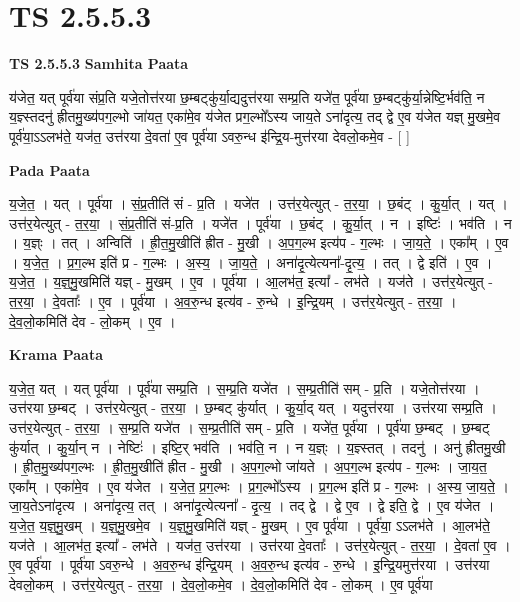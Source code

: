 \documentclass[17pt]{extarticle}
\begin{document}
\section{ TS 2.5.5.3 }

\textbf{TS 2.5.5.3 } \newline
\textbf{Samhita Paata} \newline

य॑जेत॒ यत् पूर्व॑या संप्र॒ति यजे॒तोत्त॑रया छ॒म्बट्कु॑र्या॒द्यदुत्त॑रया सम्प्र॒ति यजे॑त॒ पूर्व॑या छ॒म्बट्कु॑र्या॒न्नेष्टि॒र्भव॑ति॒ न य॒ज्ञ्स्तदनु॑ ह्रीतमु॒ख्य॑पग॒ल्भो जा॑यत॒ एका॑मे॒व य॑जेत प्रग॒ल्भो᳚ऽस्य जाय॒ते ऽना॑दृत्य॒ तद् द्वे ए॒व य॑जेत यज्ञ् मु॒खमे॒व पूर्व॑या॒ऽऽलभ॑ते॒ यज॑त॒ उत्त॑रया दे॒वता॑ ए॒व पूर्व॑या ऽवरु॒न्ध इ॑न्द्रि॒य-मुत्त॑रया देवलो॒कमे॒व - [  ] \newline

\textbf{Pada Paata} \newline

य॒जे॒त॒ । यत् । पूर्व॑या । सं॒प्र॒तीति॑ सं - प्र॒ति । यजे॑त । उत्त॑र॒येत्युत् - त॒र॒या॒ । छ॒बंट् । कु॒र्या॒त् । यत् । उत्त॑र॒येत्युत् - त॒र॒या॒ । सं॒प्र॒तीति॑ सं-प्र॒ति । यजे॑त । पूर्व॑या । छ॒बंट् । कु॒र्या॒त् । न । इष्टिः॑ । भव॑ति । न । य॒ज्ञ्ः । तत् । अन्विति॑ । ह्री॒त॒मु॒खीति॑ ह्रीत - मु॒खी । अ॒प॒ग॒ल्भ इत्य॑प - ग॒ल्भः । जा॒य॒ते॒ । एका᳚म् । ए॒व । य॒जे॒त॒ । प्र॒ग॒ल्भ इति॑ प्र - ग॒ल्भः । अ॒स्य॒ । जा॒य॒ते॒ । अना॑दृ॒त्येत्यना᳚-दृ॒त्य॒ । तत् । द्वे इति॑ । ए॒व । य॒जे॒त॒ । य॒ज्ञ्॒मु॒खमिति॑ यज्ञ् - मु॒खम् । ए॒व । पूर्व॑या । आ॒लभ॑त॒ इत्या᳚ - लभ॑ते । यज॑ते । उत्त॑र॒येत्युत् - त॒र॒या॒ । दे॒वताः᳚ । ए॒व । पूर्व॑या । अ॒व॒रु॒न्ध इत्य॑व - रु॒न्धे । इ॒न्द्रि॒यम् । उत्त॑र॒येत्युत् - त॒र॒या॒ । दे॒व॒लो॒कमिति॑ देव - लो॒कम् । ए॒व ।  \newline


\textbf{Krama Paata} \newline

य॒जे॒त॒ यत् । यत् पूर्व॑या । पूर्व॑या सम्प्र॒ति । स॒म्प्र॒ति यजे॑त । स॒म्प्र॒तीति॑ सम् - प्र॒ति । यजे॒तोत्त॑रया । उत्त॑रया छ॒म्बट् । उत्त॑र॒येत्युत् - त॒र॒या॒ । छ॒म्बट् कु॑र्यात् । कु॒र्या॒द् यत् । यदुत्त॑रया । उत्त॑रया सम्प्र॒ति । उत्त॑र॒येत्युत् - त॒र॒या॒ । स॒म्प्र॒ति यजे॑त । स॒म्प्र॒तीति॑ सम् - प्र॒ति । यजे॑त॒ पूर्व॑या । पूर्व॑या छ॒म्बट् । छ॒म्बट् कु॑र्यात् । कु॒र्या॒न् न । नेष्टिः॑ । इष्टि॒र् भव॑ति । भव॑ति॒ न । न य॒ज्ञ्ः । य॒ज्ञ्स्तत् । तदनु॑ । अनु॑ ह्रीतमु॒खी । ह्री॒त॒मु॒ख्य॑पग॒ल्भः । ह्री॒त॒मु॒खीति॑ ह्रीत - मु॒खी । अ॒प॒ग॒ल्भो जा॑यते । अ॒प॒ग॒ल्भ इत्य॑प - ग॒ल्भः । जा॒य॒त॒ एका᳚म् । एका॑मे॒व । ए॒व य॑जेत । य॒जे॒त॒ प्र॒ग॒ल्भः । प्र॒ग॒ल्भो᳚ऽस्य । प्र॒ग॒ल्भ इति॑ प्र - ग॒ल्भः । अ॒स्य॒ जा॒य॒ते॒ । जा॒य॒तेऽना॑दृत्य । अना॑दृत्य॒ तत् । अना॑दृ॒त्येत्यना᳚ - दृ॒त्य॒ । तद् द्वे । द्वे ए॒व । द्वे इति॒ द्वे । ए॒व य॑जेत । य॒जे॒त॒ य॒ज्ञ्॒मु॒खम् । य॒ज्ञ्॒मु॒खमे॒व । य॒ज्ञ्॒मु॒खमिति॑ यज्ञ् - मु॒खम् । ए॒व पूर्व॑या । पूर्व॑या॒ ऽऽलभ॑ते । आ॒लभ॑ते॒ यज॑ते । आ॒लभ॑त॒ इत्या᳚ - लभ॑ते । यज॑त॒ उत्त॑रया । उत्त॑रया दे॒वताः᳚ । उत्त॑र॒येत्युत् - त॒र॒या॒ । दे॒वता॑ ए॒व । ए॒व पूर्व॑या । पूर्व॑या ऽवरु॒न्धे । अ॒व॒रु॒न्ध इ॑न्द्रि॒यम् । अ॒व॒रु॒न्ध इत्य॑व - रु॒न्धे । इ॒न्द्रि॒यमुत्त॑रया । उत्त॑रया देवलो॒कम् । उत्त॑र॒येत्युत् - त॒र॒या॒ । दे॒व॒लो॒कमे॒व । दे॒व॒लो॒कमिति॑ देव - लो॒कम् । ए॒व पूर्व॑या \newline
\end{document}
